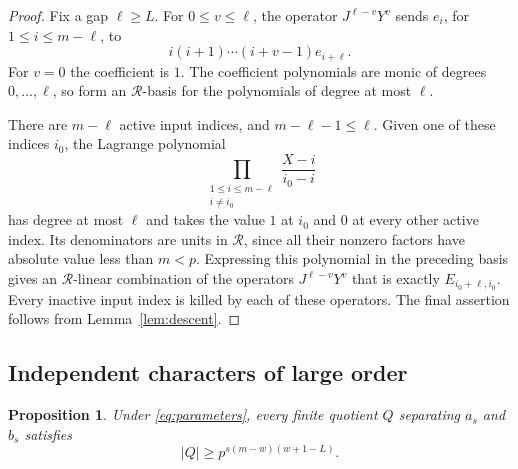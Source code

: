 \documentclass[11pt]{article}
\numberwithin{equation}{section}
\newtheorem{proposition}[theorem]{Proposition}
\theoremstyle{remark}
\begin{document}
\begin{proof}
Fix a gap $\ell\ge L$. For $0\le v\le\ell$, the operator
$J^{\ell-v}Y^v$ sends $e_i$, for $1\le i\le m-\ell$, to
\[
 i(i+1)\cdots(i+v-1)e_{i+\ell}.
\]
For $v=0$ the coefficient is $1$. The coefficient polynomials are
monic of degrees $0,\ldots,\ell$, so form an $\mathcal R$-basis
for the polynomials of degree at most $\ell$.

There are $m-\ell$ active input indices, and
$m-\ell-1\le\ell$. Given one of these indices $i_0$, the Lagrange
polynomial
\[
 \prod_{\substack{1\le i\le m-\ell\\i\ne i_0}}
 \frac{X-i}{i_0-i}
\]
has degree at most $\ell$ and takes the value $1$ at $i_0$ and $0$
at every other active index. Its denominators are units in
$\mathcal R$, since all their nonzero factors have absolute value
less than $m<p$. Expressing this polynomial in the preceding basis
gives an $\mathcal R$-linear combination of the operators
$J^{\ell-v}Y^v$ that is exactly $E_{i_0+\ell,i_0}$. Every inactive
input index is killed by each of these operators. The final assertion
follows from Lemma~\ref{lem:descent}.
\end{proof}

\subsection{Independent characters of large order}

\begin{proposition}\label{prop:quotientbound}
Under \eqref{eq:parameters}, every finite quotient $Q$ separating
$a_s$ and $b_s$ satisfies
\begin{equation}\label{eq:quotientbound}
 |Q|\ge p^{s(m-w)(w+1-L)}.
\end{equation}
\end{proposition}
\end{document}
